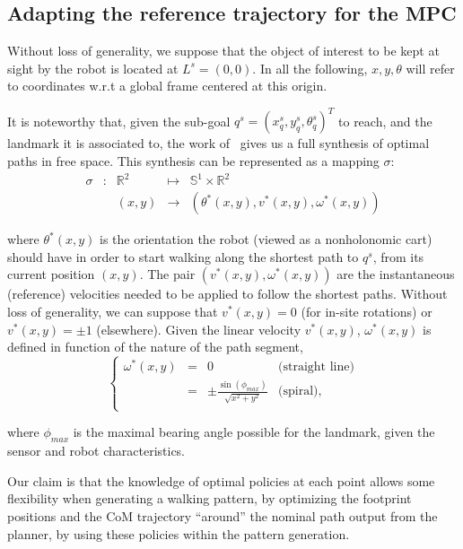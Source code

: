 \subsection{Adapting the reference trajectory for the MPC}

Without loss of generality, we suppose that the object of interest to be kept at sight by the robot is located at $L^s = (0,0)$. In all the following, $x,y,\theta$ will refer to coordinates w.r.t a global frame centered at this origin.

It is noteworthy that, given the sub-goal $q^s =(x_q^s,y_q^s,\theta_q^s)^T$ to reach, and the landmark it is associated to, the work of~\citep{Salaris:2010} gives us a full synthesis of optimal paths in free space. This synthesis can be represented as a mapping $\sigma$:
$$
\begin{array}{cccccc}
\sigma & : & \mathbb{R}^2 & \mapsto & \mathbb{S}^1 \times \mathbb{R}^2\\
& & (x,y) & \rightarrow & (\theta^*(x,y),v^*(x,y),\omega^*(x,y))
\end{array}
$$

where $\theta^*(x,y)$ is the orientation the robot (viewed as a nonholonomic cart)  should have in order to start walking along the shortest path to $q^s$, from its current position $(x,y)$. The pair $(v^*(x,y),\omega^*(x,y))$ are the instantaneous (reference) velocities needed to be applied to follow the shortest paths. Without loss of generality, we can suppose that $v^*(x,y)=0$ (for in-site rotations) or $v^*(x,y)=\pm 1$ (elsewhere). Given the linear velocity $v^*(x,y)$, $\omega^*(x,y)$ is defined in function of the nature  of the path segment,
$$
\left\{
\begin{array}{cccc}
 \omega^*(x,y) & = & 0 & \mbox{(straight line)}\\
  & = & \pm\frac{\sin(\phi_{max})}{\sqrt{x^2+y^2}} & \mbox{(spiral)},\\
\end{array}
\right.
$$

where $\phi_{max}$ is the maximal bearing angle possible for the landmark, given the sensor and robot characteristics.

Our claim is that the knowledge of optimal policies at each point allows some flexibility when generating a walking pattern, by optimizing the footprint positions and  the CoM trajectory ``around'' the nominal path output from the planner, by using these policies within the pattern generation.

